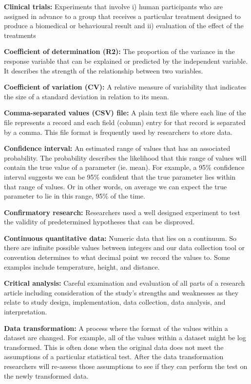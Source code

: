 \documentclass[
]{book}
\begin{document}
\textbf{Clinical trials:} Experiments that involve i) human participants who are assigned in advance to a group that receives a particular treatment designed to produce a biomedical or behavioural result and ii) evaluation of the effect of the treatments

\textbf{Coefficient of determination (R2):} The proportion of the variance in the response variable that can be explained or predicted by the independent variable. It describes the strength of the relationship between two variables.

\textbf{Coefficient of variation (CV):} A relative measure of variability that indicates the size of a standard deviation in relation to its mean.

\textbf{Comma-separated values (CSV) file:} A plain text file where each line of the file represents a record and each field (column) entry for that record is separated by a comma. This file format is frequently used by researchers to store data.

\textbf{Confidence interval:} An estimated range of values that has an associated probability. The probability describes the likelihood that this range of values will contain the true value of a parameter (ie. mean). For example, a 95\% confidence interval suggests we can be 95\% confident that the true parameter lies within that range of values. Or in other words, on average we can expect the true parameter to lie in this range, 95\% of the time.

\textbf{Confirmatory research:} Researchers used a well designed experiment to test the validity of predetermined hypotheses that can be disproved.

\textbf{Continuous quantitative data:} Numeric data that lies on a continuum. So there are infinite possible values between integers and our data collection tool or convention determines to what decimal point we record the values to. Some examples include temperature, height, and distance.

\textbf{Critical analysis:} Careful examination and evaluation of all parts of a research article including consideration of the study's strengths and weaknesses as they relate to study design, implementation, data collection, data analysis, and interpretation.

\textbf{Data transformation:} A process where the format of the values within a dataset are changed. For example, all of the values within a dataset might be log transformed. This is often done when the original data does not meet the assumptions of a particular statistical test. After the data transformation researchers will re-assess those assumptions to see if they can perform the test on the newly transformed data.
\end{document}

